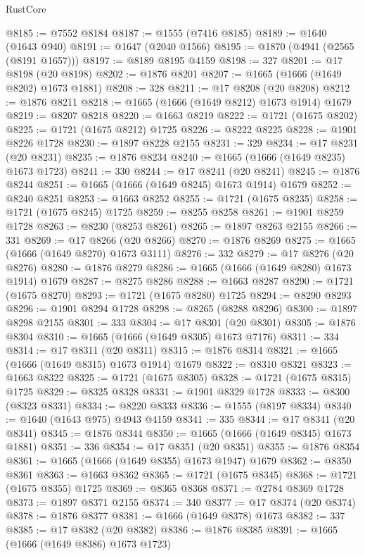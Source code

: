 \begin{lexlean}{RustCore}
\begin{coremodule}
@8185 := @7552 @8184
@8187 := @1555 (@7416 @8185)
@8189 := @1640 (@1643 @940)
@8191 := @1647 (@2040 @1566)
@8195 := @1870 (@4941 (@2565 (@8191 @1657)))
@8197 := @8189 @8195 @4159
@8198 := 327
@8201 := @17 @8198 (@20 @8198)
@8202 := @1876 @8201
@8207 := @1665 (@1666 (@1649 @8202) @1673 @1881)
@8208 := 328
@8211 := @17 @8208 (@20 @8208)
@8212 := @1876 @8211
@8218 := @1665 (@1666 (@1649 @8212) @1673 @1914) @1679
@8219 := @8207 @8218
@8220 := @1663 @8219
@8222 := @1721 (@1675 @8202)
@8225 := @1721 (@1675 @8212) @1725
@8226 := @8222 @8225
@8228 := @1901 @8226 @1728
@8230 := @1897 @8228 @2155
@8231 := 329
@8234 := @17 @8231 (@20 @8231)
@8235 := @1876 @8234
@8240 := @1665 (@1666 (@1649 @8235) @1673 @1723)
@8241 := 330
@8244 := @17 @8241 (@20 @8241)
@8245 := @1876 @8244
@8251 := @1665 (@1666 (@1649 @8245) @1673 @1914) @1679
@8252 := @8240 @8251
@8253 := @1663 @8252
@8255 := @1721 (@1675 @8235)
@8258 := @1721 (@1675 @8245) @1725
@8259 := @8255 @8258
@8261 := @1901 @8259 @1728
@8263 := @8230 (@8253 @8261)
@8265 := @1897 @8263 @2155
@8266 := 331
@8269 := @17 @8266 (@20 @8266)
@8270 := @1876 @8269
@8275 := @1665 (@1666 (@1649 @8270) @1673 @3111)
@8276 := 332
@8279 := @17 @8276 (@20 @8276)
@8280 := @1876 @8279
@8286 := @1665 (@1666 (@1649 @8280) @1673 @1914) @1679
@8287 := @8275 @8286
@8288 := @1663 @8287
@8290 := @1721 (@1675 @8270)
@8293 := @1721 (@1675 @8280) @1725
@8294 := @8290 @8293
@8296 := @1901 @8294 @1728
@8298 := @8265 (@8288 @8296)
@8300 := @1897 @8298 @2155
@8301 := 333
@8304 := @17 @8301 (@20 @8301)
@8305 := @1876 @8304
@8310 := @1665 (@1666 (@1649 @8305) @1673 @7176)
@8311 := 334
@8314 := @17 @8311 (@20 @8311)
@8315 := @1876 @8314
@8321 := @1665 (@1666 (@1649 @8315) @1673 @1914) @1679
@8322 := @8310 @8321
@8323 := @1663 @8322
@8325 := @1721 (@1675 @8305)
@8328 := @1721 (@1675 @8315) @1725
@8329 := @8325 @8328
@8331 := @1901 @8329 @1728
@8333 := @8300 (@8323 @8331)
@8334 := @8220 @8333
@8336 := @1555 (@8197 @8334)
@8340 := @1640 (@1643 @975) @4943 @4159
@8341 := 335
@8344 := @17 @8341 (@20 @8341)
@8345 := @1876 @8344
@8350 := @1665 (@1666 (@1649 @8345) @1673 @1881)
@8351 := 336
@8354 := @17 @8351 (@20 @8351)
@8355 := @1876 @8354
@8361 := @1665 (@1666 (@1649 @8355) @1673 @1947) @1679
@8362 := @8350 @8361
@8363 := @1663 @8362
@8365 := @1721 (@1675 @8345)
@8368 := @1721 (@1675 @8355) @1725
@8369 := @8365 @8368
@8371 := @2784 @8369 @1728
@8373 := @1897 @8371 @2155
@8374 := 340
@8377 := @17 @8374 (@20 @8374)
@8378 := @1876 @8377
@8381 := @1666 (@1649 @8378) @1673
@8382 := 337
@8385 := @17 @8382 (@20 @8382)
@8386 := @1876 @8385
@8391 := @1665 (@1666 (@1649 @8386) @1673 @1723)

\end{coremodule}
\end{lexlean}
